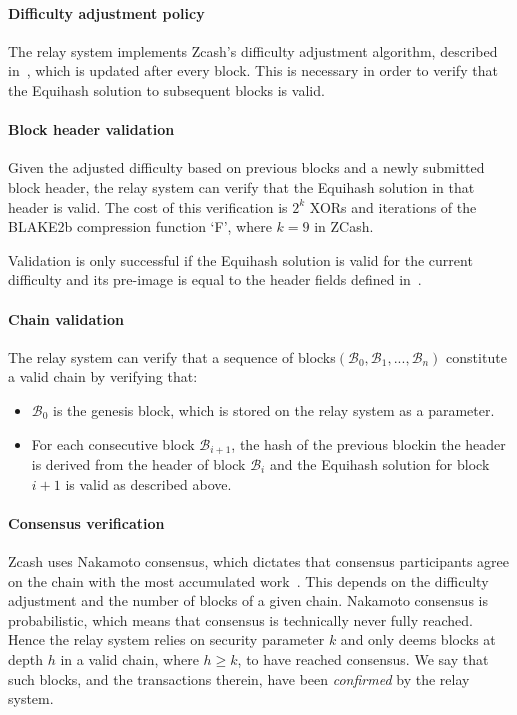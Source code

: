 \paragraph{Difficulty adjustment policy}
The relay system implements Zcash's difficulty adjustment algorithm, described in~\cite[Section 7.6.3]{hopwood2016zcash}, which is updated after every block.
This is necessary in order to verify that the Equihash solution to subsequent blocks is valid.

\paragraph{Block header validation}
Given the adjusted difficulty based on previous blocks and a newly submitted block header, the relay system can verify that the Equihash solution in that header is valid.
The cost of this verification is $2^k$ XORs and iterations of the BLAKE2b compression function `F', where $k = 9$ in ZCash.

Validation is only successful if the Equihash solution is valid for the current difficulty and its pre-image is equal to the header fields defined in~\cite[Section 7.6.1]{hopwood2016zcash}.

\paragraph{Chain validation}
The relay system can verify that a sequence of blocks\break $(\mathcal{B}_0, \mathcal{B}_1, ..., \mathcal{B}_n)$ constitute a valid chain by verifying that:
\begin{itemize}
    \item $\mathcal{B}_0$ is the genesis block, which is stored on the relay system as a parameter.
    \item For each consecutive block $\mathcal{B}_{i+1}$, the hash of the previous block\break \hpv in the header is derived from the header of block $\mathcal{B}_{i}$ and the Equihash solution for block $i+1$ is valid as described above.
\end{itemize}

\paragraph{Consensus verification}
Zcash uses Nakamoto consensus, which dictates that consensus participants agree on the chain with the most accumulated work~\cite{nakamoto2008bitcoin}.
This depends on the difficulty adjustment and the number of blocks of a given chain.
Nakamoto consensus is probabilistic, which means that consensus is technically never fully reached.
Hence the relay system relies on security parameter $k$ and only deems blocks at depth $h$ in a valid chain, where $h \geq k$, to have reached consensus.
We say that such blocks, and the transactions therein, have been \emph{confirmed} by the relay system.

